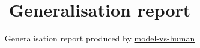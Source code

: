 \documentclass[]{article}
\title{Generalisation report}
\author{%
	Generalisation report produced by \href{https://github.com/bethgelab/model-vs-human}{model-vs-human}\\
}
\begin{document}
\newcommand{\figwidth}{0.24\textwidth}
\newcommand{\captionspace}{-1.5\baselineskip}
\newcommand{\captionspaceII}{0.6\baselineskip}
\newcommand{\captionspaceBenchmark}{-0.5\baselineskip}


\maketitle









\end{document}
